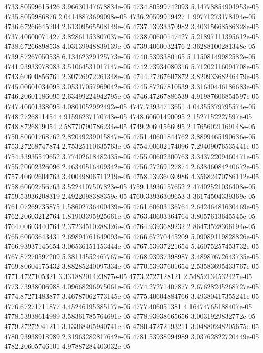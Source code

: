 {4733.80599615426 3.96630147678834e-05
4734.80599742093 5.14778854904953e-05
4735.8059986876 2.04148873699098e-05
4736.20599919427 1.99771273178494e-05
4736.67266645204 2.61309565508149e-05
4737.13933370982 3.40315668586328e-05
4737.40600071427 3.82861153807037e-05
4738.00600147427 5.21897111395612e-05
4738.67266898538 4.03139948839139e-05
4739.4060032476 2.36288100281348e-05
4739.87267050538 6.13462329125773e-05
4740.5393380165 5.11508149982582e-05
4741.93933978983 3.51064531017147e-05
4742.73934080316 5.71202116094708e-05
4743.60600856761 2.30726972261348e-05
4744.27267607872 3.82093368246479e-05
4745.00601034095 3.05317057969042e-05
4745.87267810539 3.31640446186683e-05
4746.20601186095 2.63499224942795e-05
4746.47267886539 4.91987606854597e-05
4747.40601338095 4.0801052992492e-05
4747.73934713651 4.04355379795574e-05
4748.2726811454 4.91596237170743e-05
4748.60601490095 2.1527152227597e-05
4748.8726819054 2.58770790786234e-05
4749.20601566095 2.17656021169148e-05
4750.80601768762 2.82049239015847e-05
4751.40601844762 3.8899465190636e-05
4753.27268747874 2.75325110635763e-05
4754.00602174096 7.29409076535441e-05
4754.33935549652 3.77402618482435e-05
4755.00602300763 3.34372209460471e-05
4755.20602326096 2.46340516409342e-05
4756.27269127874 2.63846084240672e-05
4757.40602604763 3.40049806711219e-05
4758.13936030986 4.35682470786112e-05
4758.60602756763 3.5224107507823e-05
4759.13936157652 2.47402521036408e-05
4759.53936208319 2.4922098388359e-05
4760.33936309653 3.36174504339369e-05
4761.07269735875 1.58602736400439e-05
4761.60603136764 2.64246481630469e-05
4762.20603212764 1.81903395925661e-05
4763.40603364764 3.8057613645545e-05
4764.00603440764 2.37234510288326e-05
4764.9393689232 2.86473528366194e-05
4765.60603643431 2.69894761649093e-05
4766.67270445209 5.09089119828826e-05
4766.93937145654 3.06536151153444e-05
4767.53937221654 5.46075257453732e-05
4767.87270597209 5.38114552467767e-05
4768.93937398987 3.48987672643735e-05
4769.80604175432 3.88285240097334e-05
4770.53937601654 2.53583695433767e-05
4771.4727105321 3.33188201423877e-05
4773.2727128121 2.54852134532427e-05
4773.73938006988 4.09668296975061e-05
4774.27271407877 2.67628245268727e-05
4774.87271483877 3.46787062773145e-05
4775.40604884766 3.49380417355241e-05
4776.67271711877 4.45246195385177e-05
4777.406051381 4.16474765188407e-05
4778.53938614989 3.58361785764691e-05
4778.93938665656 3.0031929832772e-05
4779.27272041211 3.13368405940741e-05
4780.47272193211 3.04880248205675e-05
4780.93938918989 2.31963282817642e-05
4781.53938994989 3.03762822720449e-05
4782.20605746101 4.97887284403032e-05
}
